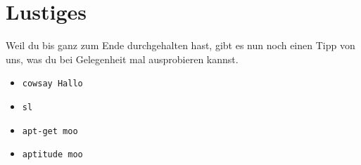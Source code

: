 \documentclass[a4paper,12pt]{article}
\begin{document}
\section{Lustiges}
Weil du bis ganz zum Ende durchgehalten hast, gibt es nun noch einen 
Tipp von uns, was du bei Gelegenheit mal ausprobieren kannst.
\begin{itemize} 
\item \texttt{cowsay Hallo}
\item \texttt{sl}
\item \texttt{apt-get moo}
\item \texttt{aptitude moo}
\end{itemize}

\end{document}
